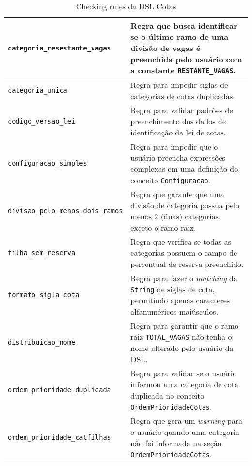 \begin{table}[ht]
\caption{Checking rules da DSL Cotas}
\label{tblcheckingrules}
\centering

\begin{tabular}{|p{6cm}|p{9cm}|}
\hline
\texttt{categoria\_resestante\_vagas} & Regra que busca identificar se o último ramo de uma divisão de vagas é preenchida pelo usuário com a constante \texttt{RESTANTE\_VAGAS}.                                                                                      \\ \hline
\texttt{categoria\_unica} & Regra para impedir siglas de categorias de cotas duplicadas.                         \\ \hline
\texttt{codigo\_versao\_lei}          & Regra para validar padrões de preenchimento dos dados de identificação da lei de cotas.                                       \\ \hline
\texttt{configuracao\_simples}          & Regra para impedir que o usuário preencha expressões complexas em uma definição do conceito \texttt{Configuracao}.
                        \\ \hline
\texttt{divisao\_pelo\_menos\_dois\_ramos}          & Regra que garante que uma divisão de categoria possua pelo menos 2 (duas) categorias, exceto o ramo raiz.
                        \\ \hline
\texttt{filha\_sem\_reserva}          & Regra que verifica se todas as categorias possuem o campo de percentual de reserva preenchido.

\\ \hline
               
\texttt{formato\_sigla\_cota}          & Regra para fazer o \textit{matching} da \texttt{String} de siglas de cota, permitindo apenas caracteres alfanuméricos maiúsculos.
\\ \hline

\texttt{distribuicao\_nome}          & Regra para garantir que o ramo raiz \texttt{TOTAL\_VAGAS} não tenha o nome alterado pelo usuário da DSL.
\\ \hline

\texttt{ordem\_prioridade\_duplicada}          & Regra para validar se o usuário informou uma categoria de cota duplicada no conceito \texttt{OrdemPrioridadeCotas}.
\\ \hline

\texttt{ordem\_prioridade\_catfilhas}          & Regra que gera um \textit{warning} para o usuário quando uma categoria não foi informada na seção \texttt{OrdemPrioridadeCotas}.
\\ \hline


\end{tabular}
\end{table}
